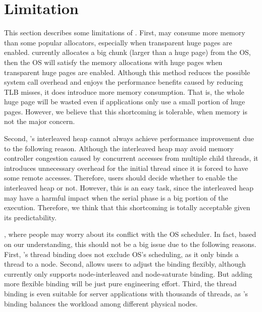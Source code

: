 \section{Limitation}
\label{sec:limit}

This section describes some limitations of \NM{}. First, \NM{} may consume more memory than some popular allocators, especially when transparent huge pages are enabled. \NM{} currently allocates a big chunk (larger than a huge page) from the OS, then the OS will satisfy the memory allocations with huge pages when transparent huge pages are enabled. Although this method reduces the possible system call overhead and enjoys the performance benefits caused by reducing TLB misses, it does introduce more memory consumption. That is, the whole huge page will be wasted even if applications only use a small portion of huge pages. However, we believe that this shortcoming is tolerable, when memory is not the major concern. 


Second, \NM{}'s interleaved heap cannot always achieve performance improvement due to the following reason. Although the interleaved heap may avoid memory controller congestion caused by concurrent accesses from multiple child threads, it introduces unnecessary overhead for the initial thread since it is forced to have some remote accesses. 
Therefore, users should decide whether to enable the interleaved heap or not. However, this is an easy task, since the interleaved heap may have a harmful impact when the serial phase is a big portion of the execution. Therefore, we think that this shortcoming is totally acceptable given its predictability. 

, where people may worry about its conflict with the OS scheduler. In fact, based on our understanding, this should not be a big issue due to the following reasons. First, \NM{}'s thread binding does not exclude OS's scheduling, as it only binds a thread to a node. Second, \NM{} allows users to adjust the binding flexibly, although currently \NM{} only supports node-interleaved and node-saturate binding. But adding more flexible binding will be just pure engineering effort. Third, the thread binding is even suitable for server applications with thousands of threads, as \NM{}'s binding balances the workload among different physical nodes. 

